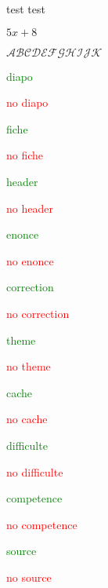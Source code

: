 \documentclass{classe-tex3R-2-1}
\begin{document}
\begin{tasks}[style=enumerate]
  \task test
  \task test
\end{tasks}


$5x+8 $

$\mathcal{ABCDEFGHIJK}$


\rivdifficulte


\begin{scratch}
\end{scratch}




\ifdiapo \textcolor{green}{diapo}\par \else \hfill \textcolor{red}{no} \textcolor{red}{diapo}\par \fi
\iffiche \textcolor{green}{fiche}\par \else \hfill \textcolor{red}{no} \textcolor{red}{fiche}\par \fi
\ifheader \textcolor{green}{header}\par \else \hfill \textcolor{red}{no} \textcolor{red}{header}\par \fi


\ifenonce \textcolor{green}{enonce}\par \else \hfill \textcolor{red}{no} \textcolor{red}{enonce}\par \fi
\ifcorrection \textcolor{green}{correction}\par \else \hfill \textcolor{red}{no} \textcolor{red}{correction}\par \fi



\iftheme \textcolor{green}{theme}\par \else \hfill \textcolor{red}{no} \textcolor{red}{theme}\par \fi
\ifcache \textcolor{green}{cache}\par \else \hfill \textcolor{red}{no} \textcolor{red}{cache}\par \fi
\ifdifficulte \textcolor{green}{difficulte}\par \else \hfill \textcolor{red}{no} \textcolor{red}{difficulte}\par \fi
\ifcompetence \textcolor{green}{competence}\par \else \hfill \textcolor{red}{no} \textcolor{red}{competence}\par \fi
\ifsource \textcolor{green}{source}\par \else \hfill \textcolor{red}{no} \textcolor{red}{source}\par \fi
\end{document}
